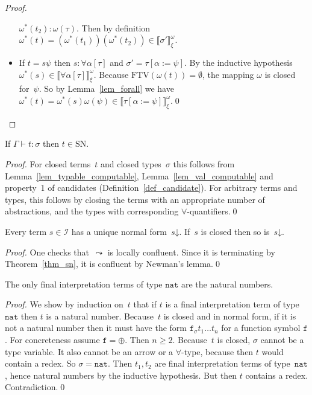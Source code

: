 \documentclass[runningheads,a4paper]{llncs}
\newcommand{\Iterms}{\mathcal{I}}
\newcommand{\subst}[2]{#1:=#2}
\newcommand{\FTV}{\mathrm{FTV}}
\newcommand{\nat}{\mathtt{nat}}
\newcommand{\da}{\mathord{\downarrow}}
\newcommand{\SN}{\mathrm{SN}}
\newcommand{\val}[3]{\ensuremath{\llbracket#1\rrbracket_{#2}^{#3}}}
\newcommand{\proves}{\vdash}
\begin{document}
\begin{proof}
\begin{itemize}
    $\omega^*(t_2) : \omega(\tau)$. Then by definition
    $\omega^*(t) = (\omega^*(t_1))(\omega^*(t_2)) \in
    \val{\sigma'}{\xi}{\omega}$.
  \item If $t = s \psi$ then $s : \forall\alpha[\tau]$ and $\sigma' =
    \tau[\subst{\alpha}{\psi}]$. By the inductive hypothesis
    $\omega^*(s) \in \val{\forall\alpha[\tau]}{\xi}{\omega}$. Because
    $\FTV(\omega(t)) = \emptyset$, the mapping $\omega$ is closed
    for~$\psi$. So by Lemma~\ref{lem_forall} we have $\omega^*(t) =
    \omega^*(s) \omega(\psi) \in
    \val{\tau[\subst{\alpha}{\psi}]}{\xi}{\omega}$.\qed
  \end{itemize}
\end{proof}

\begin{theorem}\label{thm_sn}
  If $\Gamma \proves t : \sigma$ then $t \in \SN$.
\end{theorem}

\begin{proof}
  For closed terms~$t$ and closed types~$\sigma$ this follows from
  Lemma~\ref{lem_typable_computable}, Lemma~\ref{lem_val_computable}
  and property~1 of candidates (Definition~\ref{def_candidate}). For
  arbitrary terms and types, this follows by closing the terms with an
  appropriate number of abstractions, and the types with corresponding
  $\forall$-quantifiers.\qed
\end{proof}

\begin{lemma}\label{lem_unique_final}
  Every term $s \in \Iterms$ has a unique normal form~$s\da$. If~$s$
  is closed then so is~$s\da$.
\end{lemma}

\begin{proof}
  One checks that~$\leadsto$ is locally confluent. Since it is
  terminating by Theorem~\ref{thm_sn}, it is confluent by Newman's
  lemma.\qed
\end{proof}

\begin{lemma}\label{lem_final_nat}
  The only final interpretation terms of type $\nat$ are the natural
  numbers.
\end{lemma}

\begin{proof}
  We show by induction on~$t$ that if $t$ is a final interpretation
  term of type~$\nat$ then $t$ is a natural number. Because~$t$ is
  closed and in normal form, if it is not a natural number then it
  must have the form $\mathtt{f}_\sigma t_1 \ldots t_n$ for a function
  symbol $\mathtt{f}$. For concreteness assume $\mathtt{f} =
  \oplus$. Then $n \ge 2$. Because~$t$ is closed, $\sigma$ cannot be a
  type variable. It also cannot be an arrow or a $\forall$-type,
  because then $t$ would contain a redex. So $\sigma=\nat$. Then
  $t_1,t_2$ are final interpretation terms of type~$\nat$, hence
  natural numbers by the inductive hypothesis. But then $t$ contains a
  redex. Contradiction.\qed
\end{proof}
\end{document}
